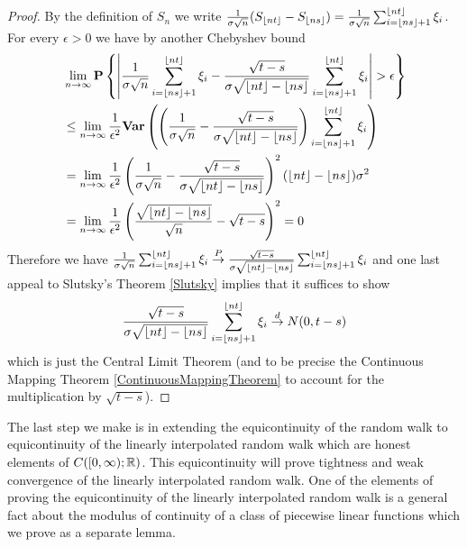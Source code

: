 \begin{proof}
By the definition of $S_n$ we write $\frac{1}{\sigma\sqrt{n}}
(S_{\left \lfloor nt \right \rfloor}-S_{\left \lfloor ns \right \rfloor}) =
\frac{1}{\sigma\sqrt{n}}\sum_{i=\left \lfloor ns \right \rfloor+1}^{\left \lfloor nt \right \rfloor}
\xi_i$.  For every $\epsilon > 0$ we have by another Chebyshev bound 
\begin{align*}
&\lim_{n \to \infty} \textbf{P}\left \{\left \vert \frac{1}{\sigma\sqrt{n}}
\sum_{i=\left \lfloor ns \right \rfloor+1}^{\left \lfloor nt \right \rfloor}\xi_i
- \frac{\sqrt{t-s}}{\sigma\sqrt{\left \lfloor nt \right \rfloor-\left \lfloor ns \right \rfloor}}
\sum_{i=\left \lfloor ns \right \rfloor+1}^{\left \lfloor nt \right \rfloor}\xi_i  \right \vert > \epsilon \right \} \\
&\leq \lim_{n \to \infty}\frac{1}{\epsilon^2}\textbf{Var} \left (\left(\frac{1}{\sigma\sqrt{n}}
-\frac{\sqrt{t-s}}{\sigma\sqrt{\left \lfloor nt \right \rfloor-\left \lfloor ns \right \rfloor}} \right)
\sum_{i=\left \lfloor ns \right \rfloor+1}^{\left \lfloor nt \right \rfloor}\xi_i \right ) \\
&= \lim_{n \to \infty}\frac{1}{\epsilon^2}\left(\frac{1}{\sigma\sqrt{n}}
-\frac{\sqrt{t-s}}{\sigma\sqrt{\left \lfloor nt \right \rfloor-\left \lfloor ns \right \rfloor}} \right)^2
(\left \lfloor nt \right \rfloor-\left \lfloor ns \right \rfloor) \sigma^2\\
&= \lim_{n \to \infty} \frac{1}{\epsilon^2} \left(
  \frac{\sqrt{\left \lfloor nt \right \rfloor-\left \lfloor ns \right \rfloor}}{\sqrt{n}} -
  \sqrt{t-s}\right)^2 = 0
\end{align*}
Therefore we have $\frac{1}{\sigma\sqrt{n}}
\sum_{i=\left \lfloor ns \right \rfloor+1}^{\left \lfloor nt \right \rfloor}\xi_i \overset{P}\to \frac{\sqrt{t-s}}{\sigma\sqrt{\left \lfloor nt \right \rfloor-\left \lfloor ns \right \rfloor}}
\sum_{i=\left \lfloor ns \right \rfloor+1}^{\left \lfloor nt \right \rfloor}\xi_i $ and one last appeal to
Slutsky's Theorem \ref{Slutsky} implies that it suffices to show
\begin{align*}
\frac{\sqrt{t-s}}{\sigma\sqrt{\left \lfloor nt \right \rfloor-\left \lfloor ns \right \rfloor}}
\sum_{i=\left \lfloor ns \right \rfloor+1}^{\left \lfloor nt \right \rfloor}\xi_i \overset{d}\to N(0, t-s)
\end{align*}
which is just the Central Limit Theorem (and to be precise the
Continuous Mapping Theorem \ref{ContinuousMappingTheorem} to account for the multiplication by $\sqrt{t-s}$).
\end{proof}

The last step we make is in extending the equicontinuity of the random
walk to equicontinuity of the linearly interpolated random walk which
are honest elements of $C([0, \infty); \mathbb{R})$.  This equicontinuity
will prove tightness and weak convergence of the linearly interpolated
random walk.  One of the elements of proving the equicontinuity of the
linearly interpolated random walk is a general fact about the modulus
of continuity of a class of piecewise linear functions which we prove
as a separate lemma.

